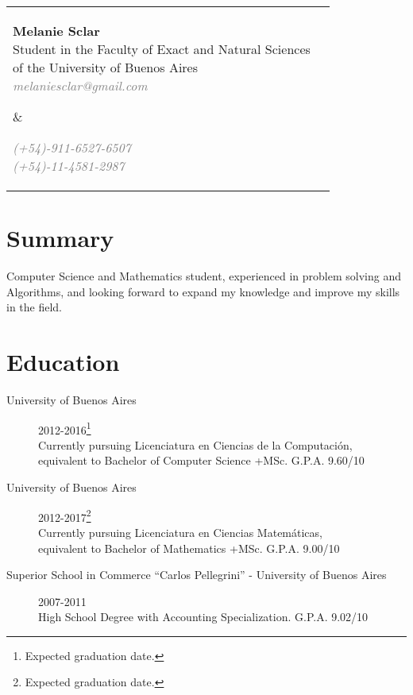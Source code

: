 \documentclass [a4paper, 11pt]{article}
\begin{document}
\noindent \begin{tabularx}{\textwidth}{X r}
  \hspace{-15pt}\parbox[t]{15cm}{
  \hspace{-2pt}\textbf{\huge{Melanie Sclar}} \\
  Student in the Faculty of Exact and Natural Sciences \\
  of the University of Buenos Aires \\
  \emph{ \textcolor{gray}{melaniesclar@gmail.com} }
  } &

\parbox[t]{3.8cm}{ \emph{\textcolor{gray}{
  (+54)-911-6527-6507 \\
  (+54)-11-4581-2987 }}
  
}
\end{tabularx}

\sectionfont{\sectionrule{0pt}{0pt}{-.2cm}{1pt}}
\section* {Summary}
Computer Science and Mathematics student, experienced in problem solving and Algorithms, and looking forward to expand my knowledge and improve my skills in the field.
\section* {Education}

\begin{description}
  \item[University of Buenos Aires]{\hfill 2012-2016\footnote{Expected graduation date.} \\
	Currently pursuing Licenciatura en Ciencias de la Computaci\'on, \\
	equivalent to Bachelor of Computer Science +MSc. G.P.A. 9.60/10}

  \item[University of Buenos Aires]{\hfill 2012-2017\footnote{Expected graduation date.} \\
	Currently pursuing Licenciatura en Ciencias Matem\'aticas, \\
	equivalent to Bachelor of Mathematics +MSc. G.P.A. 9.00/10}
	
  \item[Superior School in Commerce ``Carlos Pellegrini'' - University of Buenos Aires] {\hfill 2007-2011 \\
	High School Degree with Accounting Specialization. G.P.A. 9.02/10}
\end{description}
\end{document}
